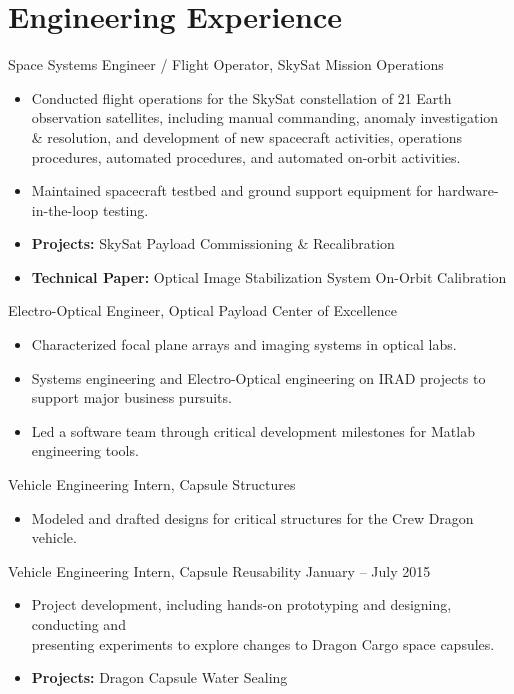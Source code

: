 \documentclass[10pt,final,sans]{resume}
\begin{document}
\section{Engineering Experience}

Space Systems Engineer / Flight Operator, SkySat Mission Operations
\begin{itemize}
  \item Conducted flight operations for the SkySat constellation of 21 Earth 
  observation satellites, including manual commanding, anomaly investigation \&
  resolution, and development of new spacecraft activities, operations 
  procedures, automated procedures, and automated on-orbit activities.
  \item Maintained spacecraft testbed and ground support equipment for
  hardware-in-the-loop testing.
  \item {\bf Projects:} SkySat Payload Commissioning \& Recalibration
  \item {\bf Technical Paper:} Optical Image Stabilization System On-Orbit Calibration
\end{itemize}

Electro-Optical Engineer, Optical Payload Center of Excellence
\begin{itemize}
  \item Characterized focal plane arrays and imaging systems in optical labs.
  \item Systems engineering and Electro-Optical engineering on IRAD projects to
  support major business pursuits.
  \item Led a software team through critical development milestones for Matlab
  engineering tools.
\end{itemize} 
Vehicle Engineering Intern, Capsule Structures
\begin{itemize}
  \item Modeled and drafted designs for critical structures for the Crew Dragon
  vehicle.
\end{itemize}

Vehicle Engineering Intern, Capsule Reusability \hfill January -- July 2015
\begin{itemize}
  \item Project development, including hands-on prototyping and designing,
  conducting and \\
  presenting experiments to explore changes to Dragon Cargo space capsules.
  \item {\bf Projects:} Dragon Capsule Water Sealing
\end{itemize}
\end{document}

